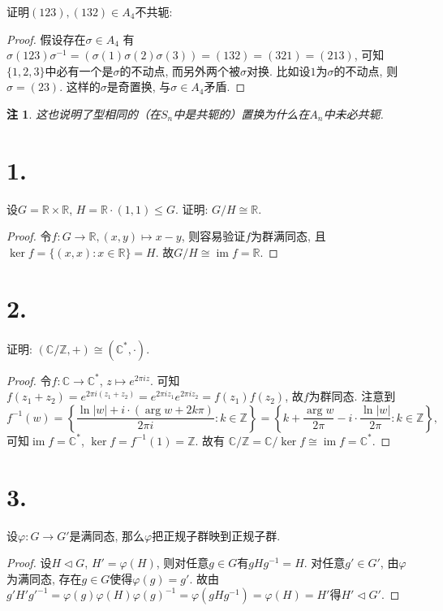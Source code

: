 \documentclass[12pt, a4paper, fontset=windows]{ctexart}
\newcommand{\C}{\mathbb{C}}
\newcommand{\R}{\mathbb{R}}
\newcommand{\Z}{\mathbb{Z}}
\newcommand{\abs}[1]{\left|{#1}\right|}
\newcommand{\im}{\operatorname{im}}
\newcommand{\isom}{\cong} %
\newcommand{\kh}[1]{（{#1}）} %
\newtheorem*{remark}{注}
\begin{document}
证明$(123),(132)\in A_4$不共轭: 

\begin{proof}
假设存在$\sigma\in A_4$
有$\sigma(123)\sigma^{-1}=(\sigma(1)\sigma(2)\sigma(3))=(132)=(321)=(213)$, 
可知$\{1,2,3\}$中必有一个是$\sigma$的不动点, 而另外两个被$\sigma$对换. 
比如设$1$为$\sigma$的不动点, 则$\sigma=(23)$. 这样的$\sigma$是奇置换, 
与$\sigma\in A_4$矛盾. 
\end{proof}

\begin{remark}
这也说明了型相同的\kh{在$S_n$中是共轭的}置换为什么在$A_n$中未必共轭. 
\end{remark}

\section*{1.}

设$G=\R\times\R$, $H=\R\cdot(1,1)\le G$. 证明: $G/H\isom\R$. 

\begin{proof}
令$f:G\to\R,(x,y)\mapsto x-y$, 则容易验证$f$为群满同态, 
且$\ker f=\{(x,x):x\in\R\}=H$. 故$G/H\isom\im f=\R$.
\end{proof}

\section*{2.}
\label{C-exp}

证明: $(\C/\Z,+)\isom(\C^*,\cdot)$.

\begin{proof}
令$f:\C\to\C^*$, $z\mapsto e^{2\pi iz}$. 
可知$f(z_1+z_2)=e^{2\pi i(z_1+z_2)}=e^{2\pi iz_1}e^{2\pi iz_2}=f(z_1)f(z_2)$, 
故$f$为群同态. 注意到
\[f^{-1}(w)=\left\{\frac{\ln\abs{w}+i\cdot(\arg w+2k\pi)}{2\pi i}:k\in\Z\right\}=\left\{k+\frac{\arg w}{2\pi}-i\cdot\frac{\ln\abs{w}}{2\pi}:k\in\Z\right\},\] 
可知$\im f=\C^*$, $\ker f=f^{-1}(1)=\Z$. 故有
$\C/\Z=\C/\ker f\isom\im f=\C^*$. 
\end{proof}

\section*{3.}

设$\varphi:G\to G'$是满同态, 那么$\varphi$把正规子群映到正规子群. 

\begin{proof}
设$H\lhd G$, $H'=\varphi(H)$, 则对任意$g\in G$有$gHg^{-1}=H$. 
对任意$g'\in G'$, 由$\varphi$为满同态, 存在$g\in G$使得$\varphi(g)=g'$. 故由
$g'H'g'^{-1}=\varphi(g)\varphi(H)\varphi(g)^{-1}
=\varphi(gHg^{-1})=\varphi(H)=H'$得$H'\lhd G'$. 
\end{proof}
\end{document}

